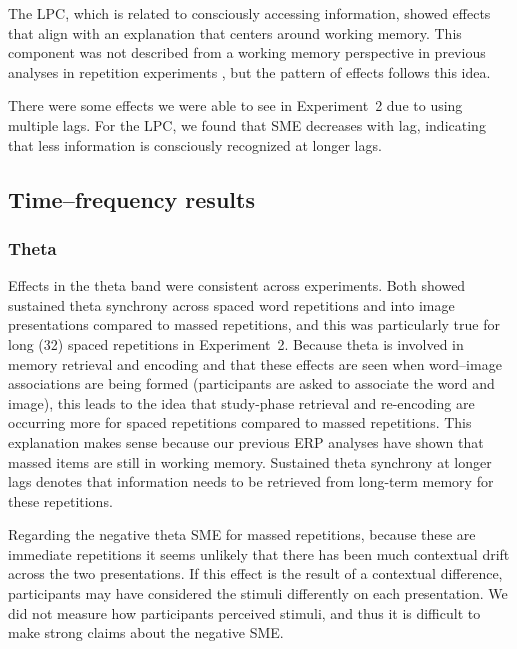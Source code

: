 

The LPC, which is related to consciously accessing information, showed effects that align with an explanation that centers around working memory.  This component was not described from a working memory perspective in previous analyses in repetition experiments \cite[rather, they discussed it as ``template matching'']{OlicEtal2000,VanSEtal2007}, but the pattern of effects follows this idea.

There were some effects we were able to see in Experiment~2 due to using multiple lags.  For the LPC, we found that SME decreases with lag, indicating that less information is consciously recognized at longer lags.

\subsection{Time--frequency results}

\subsubsection{Theta}

Effects in the theta band were consistent across experiments.  Both showed sustained theta synchrony across spaced word repetitions and into image presentations compared to massed repetitions, and this was particularly true for long (32) spaced repetitions in Experiment~2.  Because theta is involved in memory retrieval and encoding and that these effects are seen when word--image associations are being formed (participants are asked to associate the word and image), this leads to the idea that study-phase retrieval and re-encoding are occurring more for spaced repetitions compared to massed repetitions.  This explanation makes sense because our previous ERP analyses have shown that massed items are still in working memory.  Sustained theta synchrony at longer lags denotes that information needs to be retrieved from long-term memory for these repetitions.

Regarding the negative theta SME for massed repetitions, because these are immediate repetitions it seems unlikely that there has been much contextual drift across the two presentations.  If this effect is the result of a contextual difference, participants may have considered the stimuli differently on each presentation.  We did not measure how participants perceived stimuli, and thus it is difficult to make strong claims about the negative SME.

